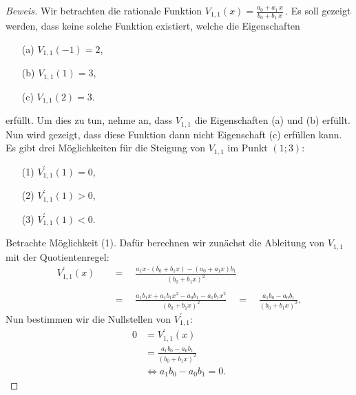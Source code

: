 \documentclass[10pt]{article}
\begin{document}
\begin{proof}[Beweis]

    Wir betrachten die rationale Funktion $V_{1,1}(x) = \frac{a_0 + a_1\,x}{b_0 + b_1\,x}$\,. Es soll gezeigt werden,
    dass keine solche Funktion existiert, welche die Eigenschaften
    \begin{itemize}
        \item[(a)] $V_{1,1}(-1) =  2$,
        \item[(b)] $V_{1,1}(1) =  3$,
        \item[(c)] $V_{1,1}(2) =  3$.
    \end{itemize}
    erfüllt. Um dies zu tun, nehme an, dass $V_{1,1}$ die Eigenschaften (a) und (b) erfüllt. Nun wird gezeigt, dass diese Funktion dann
    nicht Eigenschaft (c) erfüllen kann. Es gibt drei Möglichkeiten für die Steigung von $V_{1,1}$ im Punkt $(1;3)$:
    \begin{itemize}
        \item[(1)] $V_{1,1}^\prime(1) = 0$,
        \item[(2)] $V_{1,1}^\prime(1) > 0$,
        \item[(3)] $V_{1,1}^\prime(1) < 0$.
    \end{itemize}

    Betrachte Möglichkeit (1). Dafür berechnen wir zunächst die Ableitung von $V_{1,1}$ mit der Quotientenregel:
    \begin{align*}
        V_{1,1}^\prime(x) \quad&=\quad \frac{a_1x\cdot (b_0 + b_1x) - (a_0 + a_1x)b_1}{(b_0 + b_1x)^2} \\\\
                          \quad&=\quad \frac{a_1b_1x + a_1b_1x^2 - a_0b_1 - a_1b_1x^2}{(b_0 + b_1x)^2} 
                          \quad=\quad \frac{a_1b_0 - a_0b_1}{(b_0 + b_1x)^2}.
    \end{align*}
    Nun bestimmen wir die Nullstellen von $V_{1,1}^\prime$:
    \begin{align*}
        0 &= V_{1,1}^\prime(x) \\
          &= \frac{a_1b_0 - a_0b_1}{(b_0 + b_1x)^2} \\
          &\Leftrightarrow a_1b_0 - a_0b_1 = 0.
    \end{align*}


\end{proof}
\end{document}
